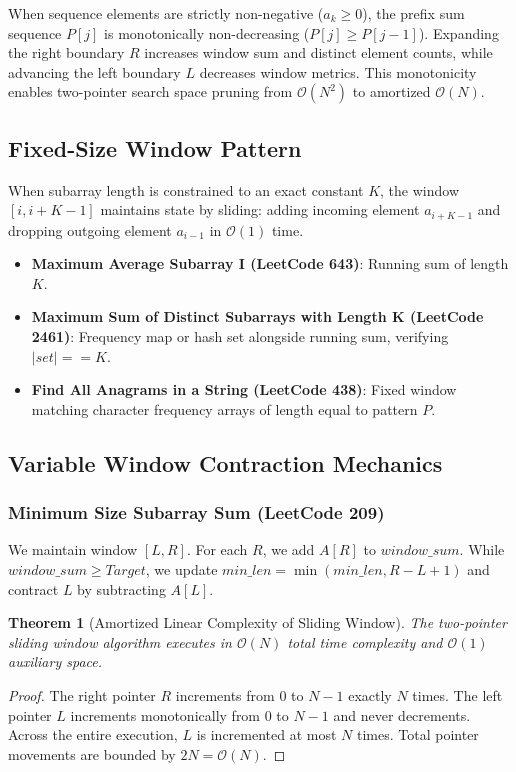 \documentclass[10pt,journal,compsoc,onecolumn]{IEEEtran}
\newtheorem{theorem}{Theorem}
\begin{document}
When sequence elements are strictly non-negative ($a_k \ge 0$), the prefix sum sequence $P[j]$ is monotonically non-decreasing ($P[j] \ge P[j-1]$). Expanding the right boundary $R$ increases window sum and distinct element counts, while advancing the left boundary $L$ decreases window metrics. This monotonicity enables two-pointer search space pruning from $\mathcal{O}(N^2)$ to amortized $\mathcal{O}(N)$.

\subsection{Fixed-Size Window Pattern}
When subarray length is constrained to an exact constant $K$, the window $[i, i + K - 1]$ maintains state by sliding: adding incoming element $a_{i+K-1}$ and dropping outgoing element $a_{i-1}$ in $\mathcal{O}(1)$ time.
\begin{itemize}
    \item \textbf{Maximum Average Subarray I (LeetCode 643)}: Running sum of length $K$.
    \item \textbf{Maximum Sum of Distinct Subarrays with Length K (LeetCode 2461)}: Frequency map or hash set alongside running sum, verifying $|set| == K$.
    \item \textbf{Find All Anagrams in a String (LeetCode 438)}: Fixed window matching character frequency arrays of length equal to pattern $P$.
\end{itemize}

\subsection{Variable Window Contraction Mechanics}

\subsubsection{Minimum Size Subarray Sum (LeetCode 209)}
We maintain window $[L, R]$. For each $R$, we add $A[R]$ to $window\_sum$. While $window\_sum \ge Target$, we update $min\_len = \min(min\_len, R - L + 1)$ and contract $L$ by subtracting $A[L]$.

\begin{theorem}[Amortized Linear Complexity of Sliding Window]
The two-pointer sliding window algorithm executes in $\mathcal{O}(N)$ total time complexity and $\mathcal{O}(1)$ auxiliary space.
\end{theorem}
\begin{proof}
The right pointer $R$ increments from $0$ to $N-1$ exactly $N$ times. The left pointer $L$ increments monotonically from $0$ to $N-1$ and never decrements. Across the entire execution, $L$ is incremented at most $N$ times. Total pointer movements are bounded by $2N = \mathcal{O}(N)$.
\end{proof}
\end{document}
